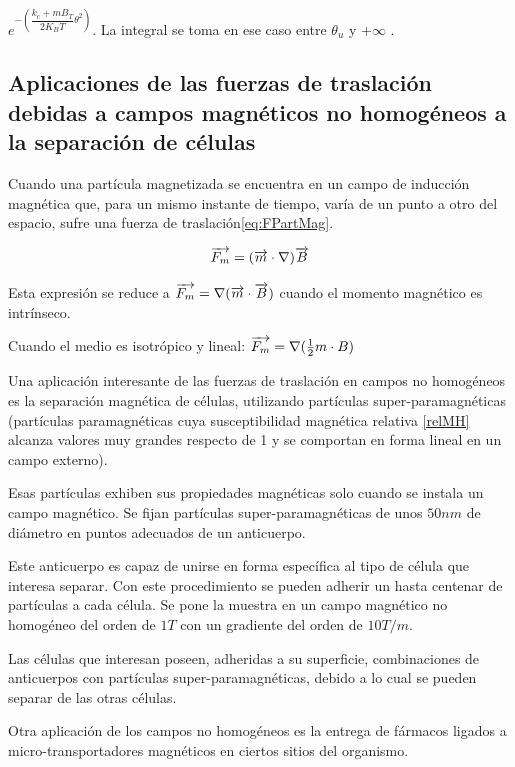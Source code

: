 $e^{-\left( \dfrac{k_{c} + mB_{T}}{2K_{B}T}\theta^{2} \right) }$. La integral se toma en ese caso entre $\theta_{u}$ y $+\infty$ .


\subsection{Aplicaciones de las fuerzas de traslación debidas a campos magnéticos no homogéneos a la separación de células}

Cuando una partícula magnetizada se encuentra en un campo de inducción magnética que, para un mismo instante de tiempo, varía de un punto a otro del espacio, sufre una fuerza de traslación\ref{eq:FPartMag}\citep{Kompaneyets}\citep{Landau8}.

\begin{equation}
	\label{eq:610}
	\overrightarrow{F_{m}}=(\overrightarrow{m}\cdot\nabla)\overrightarrow{B}
\end{equation}

Esta expresión se reduce a $\overrightarrow{F_{m}}=\nabla(\overrightarrow{m}\cdot\overrightarrow{B})$ cuando el momento magnético es intrínseco.

Cuando el medio es isotrópico y lineal: $\overrightarrow{F_{m}}=\nabla(\frac{1}{2}m\cdot B)$

Una aplicación interesante de las fuerzas de traslación en campos no homogéneos es la separación magnética de células, utilizando partículas super-paramagnéticas (partículas paramagnéticas cuya susceptibilidad magnética relativa \ref{relMH} alcanza valores muy grandes respecto de 1 y se comportan en forma lineal en un campo externo).

Esas partículas exhiben sus propiedades magnéticas solo cuando se instala un campo magnético.
Se fijan partículas super-paramagnéticas de unos $50 nm$ de diámetro en puntos adecuados de un anticuerpo.

Este anticuerpo es capaz de unirse en forma específica al tipo de célula que interesa separar.
Con este procedimiento se pueden adherir un hasta centenar de partículas a cada célula.
Se pone la muestra en un campo magnético no homogéneo del orden de $1 T$ con un gradiente del orden de $10 T/m$.

Las células que interesan poseen, adheridas a su superficie, combinaciones de anticuerpos con partículas super-paramagnéticas, debido a lo cual se pueden separar de las otras células.

Otra aplicación de los campos no homogéneos es la entrega de fármacos ligados a micro-transportadores magnéticos en ciertos sitios del organismo.

